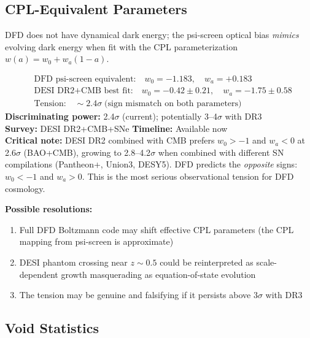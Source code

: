 \documentclass[12pt]{article}
\begin{document}
\subsection{CPL-Equivalent Parameters}

DFD does not have dynamical dark energy; the psi-screen optical bias \emph{mimics} evolving dark energy when fit with the CPL parameterization $w(a) = w_0 + w_a(1-a)$.

\begin{tensionbox}
\begin{equation}
\boxed{
\begin{aligned}
&\text{DFD psi-screen equivalent:}\quad w_0 = -1.183,\quad w_a = +0.183 \\
&\text{DESI DR2+CMB best fit:}\quad w_0 = -0.42 \pm 0.21,\quad w_a = -1.75 \pm 0.58 \\
&\text{Tension:}\quad \sim 2.4\sigma \;\text{(sign mismatch on both parameters)}
\end{aligned}
}
\end{equation}
\textbf{Discriminating power:} 2.4$\sigma$ (current); potentially 3--4$\sigma$ with DR3\\
\textbf{Survey:} DESI DR2+CMB+SNe \quad\textbf{Timeline:} Available now\\
\textbf{Critical note:} DESI DR2 combined with CMB prefers $w_0 > -1$ and $w_a < 0$ at 2.6$\sigma$ (BAO+CMB), growing to 2.8--4.2$\sigma$ when combined with different SN compilations (Pantheon+, Union3, DESY5). DFD predicts the \emph{opposite} signs: $w_0 < -1$ and $w_a > 0$. This is the most serious observational tension for DFD cosmology.

\medskip\noindent
\textbf{Possible resolutions:}
\begin{enumerate}\setlength\itemsep{0pt}
\item Full DFD Boltzmann code may shift effective CPL parameters (the CPL mapping from psi-screen is approximate)
\item DESI phantom crossing near $z\sim0.5$ could be reinterpreted as scale-dependent growth masquerading as equation-of-state evolution
\item The tension may be genuine and falsifying if it persists above 3$\sigma$ with DR3
\end{enumerate}
\end{tensionbox}

\subsection{Void Statistics}
\end{document}
